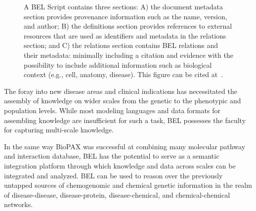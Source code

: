 \begin{figure}
    \captionsetup{format=plain}
    \caption[The Schema of a BEL Script]{A BEL Script contains three sections: A) the document metadata section provides provenance information such as the name, version, and author; B) the definitions section provides references to external resources that are used as identifiers and metadata in the relations section; and C) the relations section contains BEL relations and their metadata: minimally including a citation and evidence with the possibility to include additional information such as biological context (e.g., cell, anatomy, disease). This figure can be cited at~\cite{Hoyt2018BELSchema}.}
    \label{fig:bel_script}
\end{figure}

The foray into new disease areas and clinical indications has necessitated the assembly of knowledge on wider scales from the genetic to the phenotypic and population levels.
While most modeling languages and data formats for assembling knowledge are insufficient for such a task, BEL possesses the faculty for capturing multi-scale knowledge.

In the same way \ac{BioPAX} was successful at combining many molecular pathway and interaction database, \ac{BEL} has the potential to serve as a semantic integration platform through which knowledge and data across scales can be integrated and analyzed.
\ac{BEL} can be used to reason over the previously untapped sources of chemogenomic and chemical genetic information in the realm of disease-disease, disease-protein, disease-chemical, and chemical-chemical networks.

